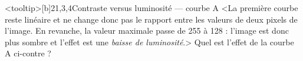 \begin{quiz}[title={Photographie numérique}]
\vspace{-\baselineskip}
%
\begin{quizquestion*}<tooltip>[b]{2}{1,3,4}{Contraste {\upshape versus} luminosité --- courbe A}
<La première courbe reste linéaire et ne change donc pas le rapport entre les valeurs de deux pixels de l'image. En revanche, la valeur maximale passe de 255 à 128 : l'image est donc plus sombre et l'effet est une \emph{baisse de luminosité}.>
Quel est l'effet de la courbe A ci-contre ?
\end{quizquestion*}


\end{quiz}
